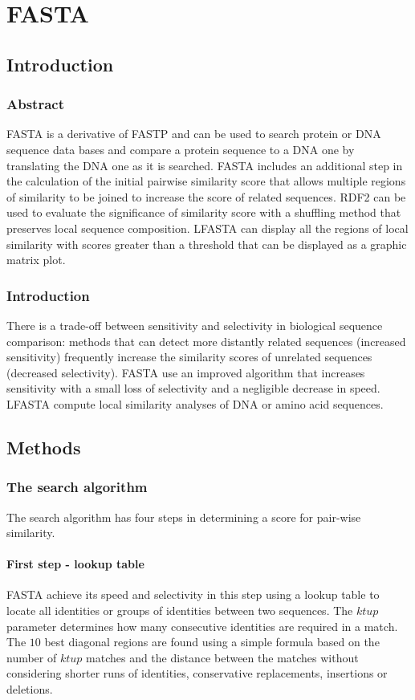 \chapter{FASTA}

\section{Introduction}

	\subsection{Abstract}
	FASTA is a derivative of FASTP and can be used to search protein or DNA sequence data bases and compare a protein sequence to a DNA one by translating the DNA one as it is searched.
	FASTA includes an additional step in the calculation of the initial pairwise similarity score that allows multiple regions of similarity to be joined to increase the score of related sequences.
	RDF2 can be used to evaluate the significance of similarity score with a shuffling method that preserves local sequence composition.
	LFASTA can display all the regions of local similarity with scores greater than a threshold that can be displayed as a graphic matrix plot.

	\subsection{Introduction}
	There is a trade-off between sensitivity and selectivity in biological sequence comparison: methods that can detect more distantly related sequences (increased sensitivity) frequently increase the similarity scores of unrelated sequences (decreased selectivity).
	FASTA use an improved algorithm that increases sensitivity with a small loss of selectivity and a negligible decrease in speed.
	LFASTA compute local similarity analyses of DNA or amino acid sequences.

\section{Methods}

	\subsection{The search algorithm}
	The search algorithm has four steps in determining a score for pair-wise similarity.

		\subsubsection{First step - lookup table}
		FASTA achieve its speed and selectivity in this step using a lookup table to locate all identities or groups of identities between two sequences.
		The $ktup$ parameter determines how many consecutive identities are required in a match.
		The $10$ best diagonal regions are found using a simple formula based on the number of $ktup$ matches and the distance between the matches without considering shorter runs of identities, conservative replacements, insertions or deletions.

